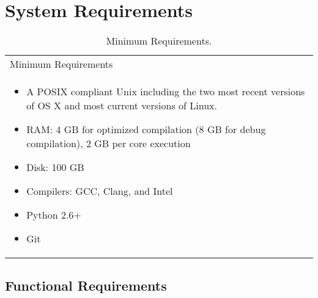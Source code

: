 \documentclass{INLreport}
\begin{document}
\section{System Requirements}

\begin{table}[!htbp]
  \caption{Minimum Requirements.\label{tab:req}}
  \begin{tabular}{|p{12cm}|}
    \rowcolor{gray}
    Minimum Requirements \\
    \begin{itemize}
    \item A POSIX compliant Unix including the two most recent versions of OS X and most current versions of Linux.
    \item RAM: 4 GB for optimized compilation (8 GB for debug compilation), 2 GB per core execution
    \item Disk: 100 GB
    \item Compilers: GCC, Clang, and Intel
    \item Python 2.6+
    \item Git
    \end{itemize} \\
    \hline
  \end{tabular}
\end{table}


\subsection{Functional Requirements}
\end{document}
